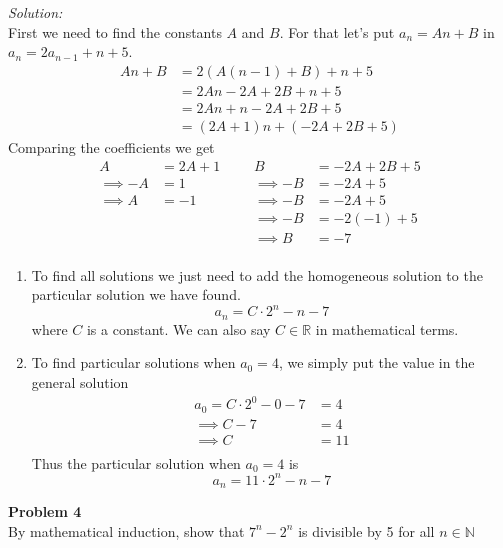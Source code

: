 \documentclass[11pt,letterpaper]{article}
\newenvironment{problem}[2][Problem]                                  
        { \begin{mdframed}[backgroundcolor=gray!20] \textbf{#1 #2} \\}
        {  \end{mdframed}}
\newenvironment{solution}                      
        {\begin{mdframed}\textit{Solution:} \\}
        {\end{mdframed}}
\begin{document}
\begin{solution}
  First we need to find the constants $A$ and $B$. For that let's put $a_n = An+B$ in $a_n = 2a_{n-1} + n + 5$.
  \begin{align*}
    An + B &= 2(A(n-1) + B) + n + 5\\
           &= 2An -2A + 2B + n + 5\\ 
           &= 2An + n -2A + 2B + 5\\ 
           &= (2A+ 1)n + (-2A + 2B + 5)
  \end{align*}
  Comparing the coefficients we get 
  \begin{align*}
    A &= 2A + 1 &&& B &= -2A + 2B + 5\\
    \implies -A &= 1 &&& \implies-B &= -2A + 5\\
    \implies A &= -1 &&& \implies-B &= -2A + 5\\
               & &&& \implies-B &= -2(-1) + 5\\
               & &&& \implies B &= -7\\
  \end{align*}
  \begin{enumerate}
    \item
      To find all solutions we just need to add the homogeneous solution to the particular solution we have found.
      \[
        a_n = C \cdot 2^n -n -7
      \]
      where $C$ is a constant. We can also say $C \in \mathbb{R}$ in mathematical terms.
    \item 
      To find particular solutions when $a_0 = 4$, we simply put the value in the general solution
      \begin{align*}
        a_0 = C \cdot 2^0 -0 -7 &= 4\\
        \implies C -7 &= 4\\
        \implies C &= 11\\
      \end{align*}
      Thus the particular solution when $a_0= 4$ is 
      \[
        a_n = 11 \cdot 2^n - n - 7
      \]
  \end{enumerate}
\end{solution}

\begin{problem}{4}
By mathematical induction, show that $7^n - 2^n$ is divisible by 5 for all $n \in \mathbb{N}$
\end{problem}
\end{document}
